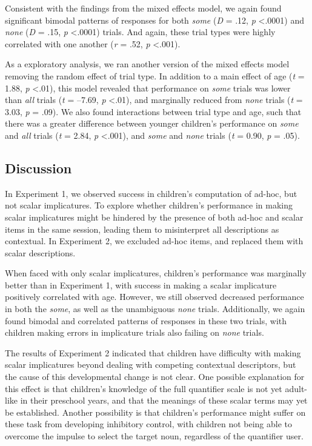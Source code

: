 \documentclass[man]{apa2}
\begin{document}
Consistent with the findings from the mixed effects model, we again found significant bimodal patterns of responses for both \textit{some} (\textit{D} = .12, \textit{p} \textless  .0001) and \textit{none} (\textit{D} = .15, \textit{p} \textless  .0001) trials. And again, these trial types were highly correlated with one another (\textit{r} = .52, \textit{p} \textless  .001). 

As a exploratory analysis, we ran another version of the mixed effects model removing the random effect of trial type. In addition to a main effect of age (\textit{t} = 1.88, \textit{p} \textless  .01), this model revealed that performance on \textit{some} trials was lower than \textit{all} trials (\textit{t} = --7.69, \textit{p} \textless  .01), and marginally reduced from \textit{none} trials (\textit{t} = 3.03, \textit{p} = .09). We also found interactions between trial type and age, such that there was a greater difference between younger children's performance on \textit{some} and \textit{all} trials (\textit{t} = 2.84, \textit{p} \textless  .001), and \textit{some} and \textit{none} trials (\textit{t} = 0.90, \textit{p} = .05). 

\subsection{Discussion}

In Experiment 1, we observed success in children's computation of ad-hoc, but not scalar implicatures. To explore whether children's performance in making scalar implicatures might be hindered by the presence of both ad-hoc and scalar items in the same session, leading them to misinterpret all descriptions as contextual. In Experiment 2, we excluded ad-hoc items, and replaced them with scalar descriptions. 

When faced with only scalar implicatures, children's performance was marginally better than in Experiment 1, with success in making a scalar implicature positively correlated with age. However, we still observed decreased performance in both the \textit{some}, as well as the unambiguous \textit{none} trials. Additionally, we again found bimodal and correlated patterns of responses in these two trials, with children making errors in implicature trials also failing on \textit{none} trials. 

The results of Experiment 2 indicated that children have difficulty with making scalar implicatures beyond dealing with competing contextual descriptors, but the cause of this developmental change is not clear. One possible explanation for this effect is that children's knowledge of the full quantifier scale is not yet adult-like in their preschool years, and that the meanings of these scalar terms may yet be established. Another possibility is that children's performance might suffer on these task from developing inhibitory control, with children not being able to overcome the impulse to select the target noun, regardless of the quantifier user. 
\end{document}
